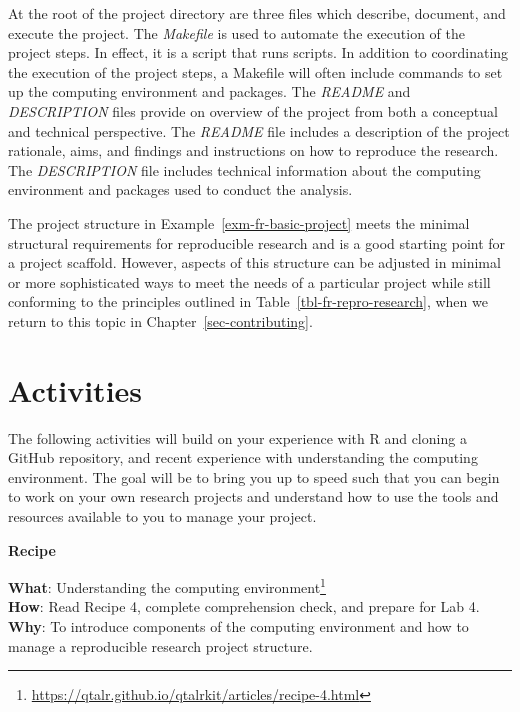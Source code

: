 \documentclass[
  letterpaper,
  DIV=11,
  numbers=noendperiod]{scrreprt}
\theoremstyle{definition}
\theoremstyle{remark}
\DeclareRobustCommand{\href}[2]{#2\footnote{\url{#1}}}
\begin{document}
At the root of the project directory are three files which describe,
document, and execute the project. The \emph{Makefile} is used to
automate the execution of the project steps. In effect, it is a script
that runs scripts. In addition to coordinating the execution of the
project steps, a Makefile will often include commands to set up the
computing environment and packages. The \emph{README} and
\emph{DESCRIPTION} files provide on overview of the project from both a
conceptual and technical perspective. The \emph{README} file includes a
description of the project rationale, aims, and findings and
instructions on how to reproduce the research. The \emph{DESCRIPTION}
file includes technical information about the computing environment and
packages used to conduct the analysis.

The project structure in Example~\ref{exm-fr-basic-project} meets the
minimal structural requirements for reproducible research and is a good
starting point for a project scaffold. However, aspects of this
structure can be adjusted in minimal or more sophisticated ways to meet
the needs of a particular project while still conforming to the
principles outlined in Table~\ref{tbl-fr-repro-research}, when we return
to this topic in Chapter~\ref{sec-contributing}.

\section*{Activities}\label{activities-2}


The following activities will build on your experience with R and
cloning a GitHub repository, and recent experience with understanding
the computing environment. The goal will be to bring you up to speed
such that you can begin to work on your own research projects and
understand how to use the tools and resources available to you to manage
your project.

\begin{tcolorbox}[enhanced jigsaw, leftrule=.75mm, colframe=quarto-callout-color-frame, colback=white, rightrule=.15mm, opacityback=0, arc=.35mm, breakable, bottomrule=.15mm, left=2mm, toprule=.15mm]

\textbf{ Recipe}

\textbf{What}:
\href{https://qtalr.github.io/qtalrkit/articles/recipe-4.html}{Understanding
the computing environment}\\
\textbf{How}: Read Recipe 4, complete comprehension check, and prepare
for Lab 4.\\
\textbf{Why}: To introduce components of the computing environment and
how to manage a reproducible research project structure.

\end{tcolorbox}
\end{document}
